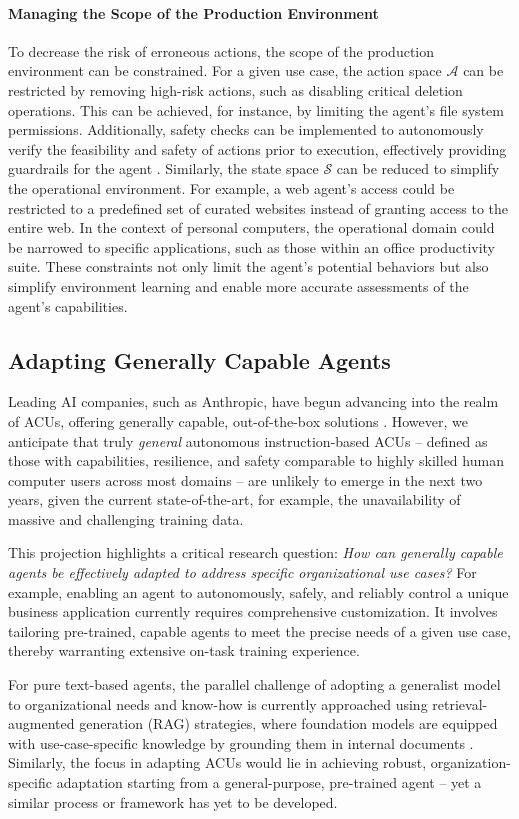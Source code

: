 \paragraph{Managing the Scope of the Production Environment} 
To decrease the risk of erroneous actions, the scope of the production environment can be constrained.
For a given use case, the action space $\mathcal{A}$ can be restricted by removing high-risk actions, such as disabling critical deletion operations. This can be achieved, for instance, by limiting the agent's file system permissions. Additionally, safety checks can be implemented to autonomously verify the feasibility and safety of actions prior to execution, effectively providing guardrails for the agent \citep{liang_taskmatrixai_2023}.
% 
Similarly, the state space $\mathcal{S}$ can be reduced to simplify the operational environment. For example, a web agent’s access could be restricted to a predefined set of curated websites instead of granting access to the entire web. In the context of personal computers, the operational domain could be narrowed to specific applications, such as those within an office productivity suite.
% 
These constraints not only limit the agent’s potential behaviors but also simplify environment learning and enable more accurate assessments of the agent's capabilities.

\subsection{Adapting Generally Capable Agents}

Leading AI companies, such as Anthropic, have begun advancing into the realm of ACUs, offering generally capable, out-of-the-box solutions \citep{hu_dawn_2024}. However, we anticipate that truly \emph{general} autonomous instruction-based ACUs -- defined as those with capabilities, resilience, and safety comparable to highly skilled human computer users across most domains -- are unlikely to emerge in the next two years, given the current state-of-the-art, for example, the unavailability of massive and challenging training data.

This projection highlights a critical research question: \textit{How can generally capable agents be effectively adapted to address specific organizational use cases?} For example, enabling an agent to autonomously, safely, and reliably control a unique business application currently requires comprehensive customization. It involves tailoring pre-trained, capable agents to meet the precise needs of a given use case, thereby warranting extensive on-task training experience.

For pure text-based agents, the parallel challenge of adopting a generalist model to organizational needs and know-how is currently approached using retrieval-augmented generation (RAG) strategies, where foundation models are equipped with use-case-specific knowledge by grounding them in internal documents \citep{lewis2020retrieval}. Similarly, the focus in adapting ACUs would lie in achieving robust, organization-specific adaptation starting from a general-purpose, pre-trained agent -- yet a similar process or framework has yet to be developed.
